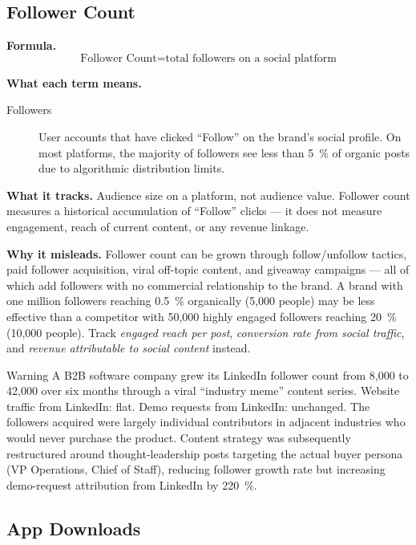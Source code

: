 \subsection{Follower Count}

\textbf{Formula.}
\[
  \text{Follower Count} = \text{total followers on a social platform}
\]

\textbf{What each term means.}
\begin{description}
  \item[Followers] User accounts that have clicked ``Follow'' on the brand's social profile.
    On most platforms, the majority of followers see less than \qty{5}{\percent} of organic
    posts due to algorithmic distribution limits.
\end{description}

\textbf{What it tracks.} Audience size on a platform, not audience value. Follower count
measures a historical accumulation of ``Follow'' clicks --- it does not measure engagement,
reach of current content, or any revenue linkage.

\textbf{Why it misleads.} Follower count can be grown through follow/unfollow tactics,
paid follower acquisition, viral off-topic content, and giveaway campaigns --- all of which
add followers with no commercial relationship to the brand. A brand with one million
followers reaching \qty{0.5}{\percent} organically (5,000 people) may be less effective than
a competitor with 50,000 highly engaged followers reaching \qty{20}{\percent} (10,000
people). Track \emph{engaged reach per post}, \emph{conversion rate from social traffic},
and \emph{revenue attributable to social content} instead.

\begin{admonition}{Warning}
A B2B software company grew its LinkedIn follower count from 8,000 to 42,000 over six months
through a viral ``industry meme'' content series. Website traffic from LinkedIn: flat.
Demo requests from LinkedIn: unchanged. The followers acquired were largely individual
contributors in adjacent industries who would never purchase the product. Content strategy
was subsequently restructured around thought-leadership posts targeting the actual buyer
persona (VP Operations, Chief of Staff), reducing follower growth rate but increasing
demo-request attribution from LinkedIn by \qty{220}{\percent}.
\end{admonition}


\subsection{App Downloads}

